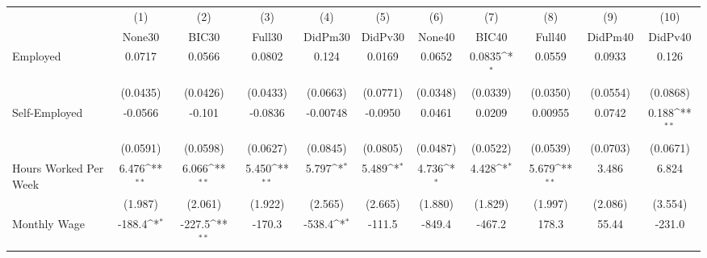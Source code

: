 {
\def\sym#1{\ifmmode^{#1}\else\(^{#1}\)\fi}
\begin{tabular}{l*{10}{c}}
\toprule
            &\multicolumn{1}{c}{(1)}&\multicolumn{1}{c}{(2)}&\multicolumn{1}{c}{(3)}&\multicolumn{1}{c}{(4)}&\multicolumn{1}{c}{(5)}&\multicolumn{1}{c}{(6)}&\multicolumn{1}{c}{(7)}&\multicolumn{1}{c}{(8)}&\multicolumn{1}{c}{(9)}&\multicolumn{1}{c}{(10)}\\
            &\multicolumn{1}{c}{None30}&\multicolumn{1}{c}{BIC30}&\multicolumn{1}{c}{Full30}&\multicolumn{1}{c}{DidPm30}&\multicolumn{1}{c}{DidPv30}&\multicolumn{1}{c}{None40}&\multicolumn{1}{c}{BIC40}&\multicolumn{1}{c}{Full40}&\multicolumn{1}{c}{DidPm40}&\multicolumn{1}{c}{DidPv40}\\
\midrule
Employed    &      0.0717         &      0.0566         &      0.0802         &       0.124         &      0.0169         &      0.0652         &      0.0835\sym{*}  &      0.0559         &      0.0933         &       0.126         \\
            &    (0.0435)         &    (0.0426)         &    (0.0433)         &    (0.0663)         &    (0.0771)         &    (0.0348)         &    (0.0339)         &    (0.0350)         &    (0.0554)         &    (0.0868)         \\
\addlinespace
Self-Employed&     -0.0566         &      -0.101         &     -0.0836         &    -0.00748         &     -0.0950         &      0.0461         &      0.0209         &     0.00955         &      0.0742         &       0.188\sym{**} \\
            &    (0.0591)         &    (0.0598)         &    (0.0627)         &    (0.0845)         &    (0.0805)         &    (0.0487)         &    (0.0522)         &    (0.0539)         &    (0.0703)         &    (0.0671)         \\
\addlinespace
Hours Worked Per Week&       6.476\sym{**} &       6.066\sym{**} &       5.450\sym{**} &       5.797\sym{*}  &       5.489\sym{*}  &       4.736\sym{*}  &       4.428\sym{*}  &       5.679\sym{**} &       3.486         &       6.824         \\
            &     (1.987)         &     (2.061)         &     (1.922)         &     (2.565)         &     (2.665)         &     (1.880)         &     (1.829)         &     (1.997)         &     (2.086)         &     (3.554)         \\
\addlinespace
Monthly Wage&      -188.4\sym{*}  &      -227.5\sym{**} &      -170.3         &      -538.4\sym{*}  &      -111.5         &      -849.4         &      -467.2         &       178.3         &       55.44         &      -231.0         \\

\end{tabular}}

